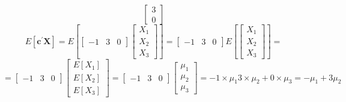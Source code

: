 \begin{enumerate}[font=\bfseries]
\begin{enumerate}
\[\begin{bmatrix}
                    3 \\
                    0
                \end{bmatrix}
            \]
            \[
                E\left[\textbf{c}^\prime\textbf{X}\right]
                =
                E\left[
                \begin{bmatrix}
                    -1 & 3 & 0
                \end{bmatrix}
                    \begin{bmatrix}
                    X_1 \\
                    X_2 \\
                    X_3
                \end{bmatrix}
                \right]
                =
                \begin{bmatrix}
                    -1 & 3 & 0
                \end{bmatrix}                
                E\left[
                \begin{bmatrix}
                    X_1 \\
                    X_2 \\
                    X_3
                \end{bmatrix}
                \right]
                =
            \]
            \[
                =
                \begin{bmatrix}
                    -1 & 3 & 0
                \end{bmatrix}                
                \begin{bmatrix}
                    E\left[X_1\right] \\
                    E\left[X_2\right] \\
                    E\left[X_3\right]
                \end{bmatrix}
                =
                \begin{bmatrix}
                    -1 & 3 & 0
                \end{bmatrix}                
                \begin{bmatrix}
                    \mu_1 \\
                    \mu_2 \\
                    \mu_3
                \end{bmatrix}
                =
                -1 \times \mu_1 3 \times \mu_2 + 0 \times \mu_3
                =
                -\mu_1 + 3 \mu_2
            \]

\end{enumerate}
\end{enumerate}
